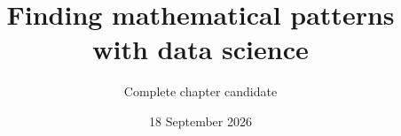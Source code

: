\documentclass[a4paper,11pt]{article}
\title{Finding mathematical patterns with data science}
\author{Complete chapter candidate}
\date{18 September 2026}
\begin{document}
\maketitle
\tableofcontents
\clearpage

\appendix

\FloatBarrier
\printbibliography
\end{document}
